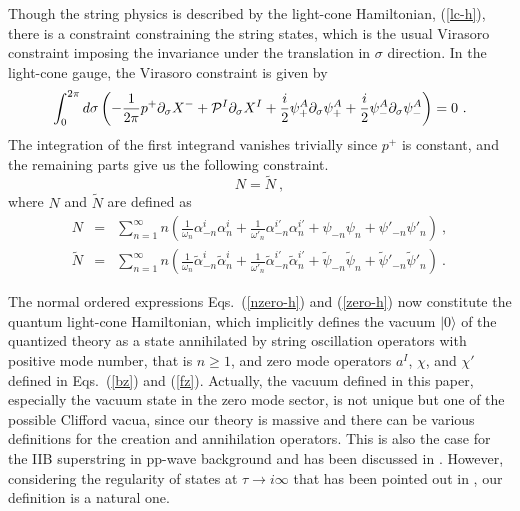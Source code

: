 \documentclass[a4paper,12pt]{article}
\numberwithin{equation}{section}
\begin{document}
Though the string physics is described by the light-cone Hamiltonian,
(\ref{lc-h}), there is a constraint constraining the string states,
which is the usual Virasoro constraint imposing the invariance under
the translation in $\sigma$ direction.  In the light-cone gauge, the
Virasoro constraint is given by
\begin{equation}
\int^{2\pi}_0 d \sigma
 \left( - \frac{1}{2\pi} p^+ \partial_\sigma X^-
   + {\cal P}^I \partial_\sigma X^I
   + \frac{i}{2} \psi^A_+ \partial_\sigma \psi^A_+
   + \frac{i}{2} \psi^A_- \partial_\sigma \psi^A_-
 \right) = 0 ~.
\end{equation}
The integration of the first integrand vanishes trivially since $p^+$
is constant, and the remaining parts give us the following constraint.
\begin{equation}
N = \tilde{N} ~,
\label{vira}
\end{equation}
where $N$ and $\tilde{N}$ are defined as
\begin{eqnarray}
N &=& \sum^\infty_{n=1} n
   \left( \frac{1}{\omega_n} \alpha^i_{-n} \alpha^i_n
         +\frac{1}{\omega'_n} \alpha^{i'}_{-n} \alpha^{i'}_n
         + \psi_{-n} \psi_n + \psi'_{-n} \psi'_n
   \right) ~,
  \nonumber \\
\tilde{N}
  &=&\sum^\infty_{n=1} n
   \left( \frac{1}{\omega_n} \tilde{\alpha}^i_{-n}
                             \tilde{\alpha}^i_n
         +\frac{1}{\omega'_n} \tilde{\alpha}^{i'}_{-n}
                              \tilde{\alpha}^{i'}_n
         + \tilde{\psi}_{-n} \tilde{\psi}_n
         + \tilde{\psi}'_{-n} \tilde{\psi}'_n
   \right) ~.
\end{eqnarray}

The normal ordered expressions Eqs.~(\ref{nzero-h}) and (\ref{zero-h})
now constitute the quantum light-cone Hamiltonian, which implicitly
defines the vacuum $|0 \rangle$ of the quantized theory as a state
annihilated by string oscillation operators with positive mode number,
that is $n \ge 1$, and zero mode operators $a^I$, $\chi$, and $\chi'$
defined in Eqs.~(\ref{bz}) and (\ref{fz}).  Actually, the vacuum
defined in this paper, especially the vacuum state in the zero mode
sector, is not unique but one of the possible Clifford vacua, since
our theory is massive and there can be various definitions for the
creation and annihilation operators.  This is also the case for the
IIB superstring in pp-wave background and has been discussed in
\cite{met109}.  However, considering the regularity of states at $\tau
\rightarrow i \infty$ that has been pointed out in \cite{rus179}, our
definition is a natural one.
\end{document}
